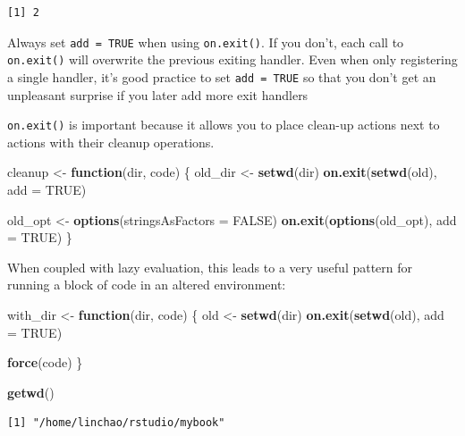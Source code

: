 \documentclass[]{book}
\newenvironment{Shaded}{\begin{snugshade}}{\end{snugshade}}
\newcommand{\ControlFlowTok}[1]{\textcolor[rgb]{0.13,0.29,0.53}{\textbf{#1}}}
\newcommand{\DataTypeTok}[1]{\textcolor[rgb]{0.13,0.29,0.53}{#1}}
\newcommand{\KeywordTok}[1]{\textcolor[rgb]{0.13,0.29,0.53}{\textbf{#1}}}
\newcommand{\NormalTok}[1]{#1}
\newcommand{\OtherTok}[1]{\textcolor[rgb]{0.56,0.35,0.01}{#1}}
\newcommand{\StringTok}[1]{\textcolor[rgb]{0.31,0.60,0.02}{#1}}
\theoremstyle{definition}
\theoremstyle{definition}
\theoremstyle{definition}
\theoremstyle{remark}
\begin{document}
\begin{verbatim}
[1] 2
\end{verbatim}

Always set \texttt{add\ =\ TRUE} when using \texttt{on.exit()}. If you
don't, each call to \texttt{on.exit()} will overwrite the previous
exiting handler. Even when only registering a single handler, it's good
practice to set \texttt{add\ =\ TRUE} so that you don't get an
unpleasant surprise if you later add more exit handlers

\texttt{on.exit()} is important because it allows you to place clean-up
actions next to actions with their cleanup operations.

\begin{Shaded}
\begin{Highlighting}[]
\NormalTok{cleanup <-}\StringTok{ }\ControlFlowTok{function}\NormalTok{(dir, code) \{}
\NormalTok{  old_dir <-}\StringTok{ }\KeywordTok{setwd}\NormalTok{(dir)}
  \KeywordTok{on.exit}\NormalTok{(}\KeywordTok{setwd}\NormalTok{(old), }\DataTypeTok{add =} \OtherTok{TRUE}\NormalTok{)}
  
\NormalTok{  old_opt <-}\StringTok{ }\KeywordTok{options}\NormalTok{(}\DataTypeTok{stringsAsFactors =} \OtherTok{FALSE}\NormalTok{)}
  \KeywordTok{on.exit}\NormalTok{(}\KeywordTok{options}\NormalTok{(old_opt), }\DataTypeTok{add =} \OtherTok{TRUE}\NormalTok{)}
\NormalTok{\}}
\end{Highlighting}
\end{Shaded}

When coupled with lazy evaluation, this leads to a very useful pattern
for running a block of code in an altered environment:

\begin{Shaded}
\begin{Highlighting}[]
\NormalTok{with_dir <-}\StringTok{ }\ControlFlowTok{function}\NormalTok{(dir, code) \{}
\NormalTok{  old <-}\StringTok{ }\KeywordTok{setwd}\NormalTok{(dir)}
  \KeywordTok{on.exit}\NormalTok{(}\KeywordTok{setwd}\NormalTok{(old), }\DataTypeTok{add =} \OtherTok{TRUE}\NormalTok{)}

  \KeywordTok{force}\NormalTok{(code)}
\NormalTok{\}}

\KeywordTok{getwd}\NormalTok{()}
\end{Highlighting}
\end{Shaded}

\begin{verbatim}
[1] "/home/linchao/rstudio/mybook"
\end{verbatim}
\end{document}
